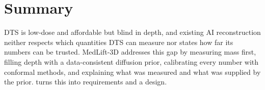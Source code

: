 \section{Summary}

DTS is low-dose and affordable but blind in depth, and existing AI reconstruction neither respects which quantities DTS can measure nor states how far its numbers can be trusted. MedLift-3D addresses this gap by measuring mass first, filling depth with a data-consistent diffusion prior, calibrating every number with conformal methods, and explaining what was measured and what was supplied by the prior.  turns this into requirements and a design.
